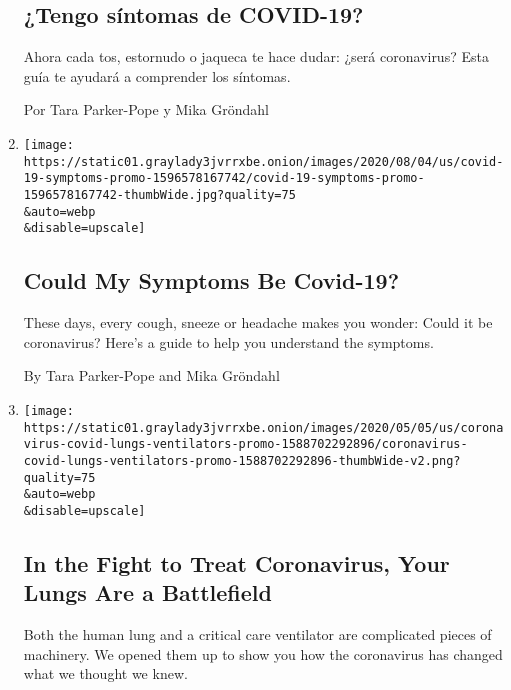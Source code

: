 \begin{enumerate}
  \hypertarget{tengo-suxedntomas-de-covid-19-1}{%
  \subsection{¿Tengo síntomas de
  COVID-19?}\label{tengo-suxedntomas-de-covid-19-1}}

  Ahora cada tos, estornudo o jaqueca te hace dudar: ¿será coronavirus?
  Esta guía te ayudará a comprender los síntomas.

  Por Tara Parker-Pope y Mika Gröndahl
\item
  \href{/interactive/2020/08/05/well/covid-19-symptoms.html}{}

  \texttt{[image: https://static01.graylady3jvrrxbe.onion/images/2020/08/04/us/covid-19-symptoms-promo-1596578167742/covid-19-symptoms-promo-1596578167742-thumbWide.jpg?quality=75\\\&auto=webp\\\&disable=upscale]}

  \hypertarget{could-my-symptoms-be-covid-19}{%
  \subsection{Could My Symptoms Be
  Covid-19?}\label{could-my-symptoms-be-covid-19}}

  These days, every cough, sneeze or headache makes you wonder: Could it
  be coronavirus? Here's a guide to help you understand the symptoms.

  By Tara Parker-Pope and Mika Gröndahl
\item
  \href{/interactive/2020/05/08/health/coronavirus-covid-lungs-ventilators.html}{}

  \texttt{[image: https://static01.graylady3jvrrxbe.onion/images/2020/05/05/us/coronavirus-covid-lungs-ventilators-promo-1588702292896/coronavirus-covid-lungs-ventilators-promo-1588702292896-thumbWide-v2.png?quality=75\\\&auto=webp\\\&disable=upscale]}

  \hypertarget{in-the-fight-to-treat-coronavirus-your-lungs-are-a-battlefield}{%
  \subsection{In the Fight to Treat Coronavirus, Your Lungs Are a
  Battlefield}\label{in-the-fight-to-treat-coronavirus-your-lungs-are-a-battlefield}}

  Both the human lung and a critical care ventilator are complicated
  pieces of machinery. We opened them up to show you how the coronavirus
  has changed what we thought we knew.


\end{enumerate}
